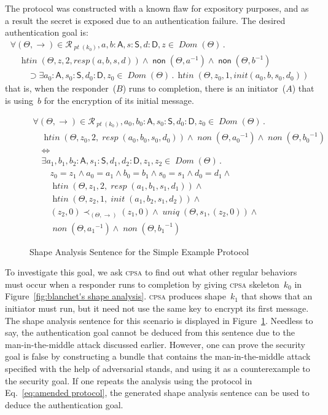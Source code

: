 \documentclass[titlepage,12pt]{article}
\newcommand{\cpsa}{\textsc{cpsa}}
\newcommand{\cn}[1]{\ensuremath{\operatorname{\mathsf{#1}}}}
\newcommand{\fn}[1]{\ensuremath{\operatorname{\mathit{#1}}}}
\newcommand{\srt}[1]{\ensuremath{\mathsf{#1}}}
\newcommand{\typ}{\mathbin:}
\newcommand{\sdom}{\fn{Dom}}
\newcommand{\invk}[1]{{#1}^{-1}}
\newcommand{\all}[1]{\forall#1\mathpunct.}
\newcommand{\some}[1]{\exists#1\mathpunct.}
\newcommand{\init}{\fn{init}}
\newcommand{\resp}{\fn{resp}}
\newcommand{\run}{\mathcal{R}}
\newcommand{\pt}{\fn{pt}}
\begin{document}
The protocol was constructed with a known flaw for expository
purposes, and as a result the secret is exposed due to an
authentication failure.
The desired authentication goal is:
$$\begin{array}{l}
\all{(\Theta,\to)\in\run_{\pt(k_0)}, a,b\typ\srt{A}, s\typ\srt{S},
  d\typ\srt{D}, z\in\sdom(\Theta)}\\
\quad\fn{htin}(\Theta,z,2,resp(a,b,s,d))\wedge
\cn{non}(\Theta,\invk{a})\wedge\cn{non}(\Theta,\invk{b})\\
\qquad\supset\some{a_0\typ\srt{A}, s_0\typ\srt{S}, d_0\typ\srt{D},
  z_0\in\sdom(\Theta)}\fn{htin}(\Theta,z_0,1,init(a_0,b,s_0,d_0))
\end{array}$$
that is, when the responder~($B$) runs to completion, there is an
initiator~($A$) that is using~$b$ for the encryption of its initial
message.

\begin{figure}
$$\begin{array}{l}
\all{(\Theta,\to)\in\run_{\pt(k_0)}, a_0,b_0\typ
\srt{A}, s_0\typ\srt{S}, d_0\typ\srt{D}, z_0\in\sdom(\Theta)}\\
\quad\fn{htin}(\Theta,z_0,2,\resp(a_0,b_0,s_0,d_0))\wedge
\fn{non}(\Theta,\invk{a_0})\wedge\fn{non}(\Theta,\invk{b_0})\\
\quad\Longleftrightarrow\\
\quad\some{a_1,b_1,b_2\typ\srt{A}, s_1\typ\srt{S},
  d_1,d_2\typ\srt{D}, z_1,z_2\in\sdom(\Theta)}\\
\qquad z_0=z_1\wedge a_0=a_1\wedge b_0=b_1\wedge s_0=s_1\wedge d_0=d_1\wedge{}\\
\qquad\fn{htin}(\Theta,z_1,2,\resp(a_1,b_1,s_1,d_1))\wedge{}\\
\qquad\fn{htin}(\Theta,z_2,1,\init(a_1,b_2,s_1,d_2))\wedge{}\\
\qquad(z_2,0)\prec_{(\Theta,\to)}(z_1,0)\wedge\fn{uniq}(\Theta,s_1,(z_2,0))\wedge{}\\
\qquad\fn{non}(\Theta,\invk{a_1})\wedge
\fn{non}(\Theta,\invk{b_1})
\end{array}$$
\caption{Shape Analysis Sentence for the Simple Example Protocol}\label{fig:blanchet's shape analysis sentence}
\end{figure}

To investigate this goal, we ask {\cpsa} to find out what other
regular behaviors must occur when a responder runs to completion by
giving {\cpsa} skeleton~$k_0$ in Figure~\ref{fig:blanchet's shape
  analysis}.  {\cpsa} produces shape~$k_1$ that shows that an
initiator must run, but it need not use the same key to encrypt its
first message.  The shape analysis sentence for this scenario is
displayed in Figure~\ref{fig:blanchet's shape analysis sentence}.
Needless to say, the authentication goal cannot be deduced from this
sentence due to the man-in-the-middle attack discussed earlier.
However, one can prove the security goal is false by
constructing a bundle that contains the man-in-the-middle attack
specified with the help of adversarial stands, and using it as a
counterexample to the security goal.  If one repeats the
analysis using the protocol in Eq.~\ref{eq:amended protocol}, the
generated shape analysis sentence can be used to deduce the
authentication goal.
\end{document}
